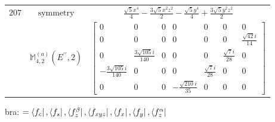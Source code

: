 \documentclass[fleqn,8pt,landscape]{jsarticle}
\begin{document}
\begin{longtable}{ccc}
$ 207 $ & $ \text{symmetry} $ & $ \frac{\sqrt{5} x^{4}}{4} - \frac{3 \sqrt{5} x^{2} z^{2}}{2} - \frac{\sqrt{5} y^{4}}{4} + \frac{3 \sqrt{5} y^{2} z^{2}}{2} $ \\
$  $ & $ \mathbb{M}_{4,2}^{(a)}(E^{\prime\prime},2) $ & $ \begin{bmatrix} 0 & 0 & 0 & 0 & 0 & 0 & 0 \\ 0 & 0 & 0 & 0 & 0 & 0 & \frac{\sqrt{42} i}{14} \\ 0 & \frac{3 \sqrt{105} i}{140} & 0 & 0 & 0 & \frac{\sqrt{7} i}{28} & 0 \\ - \frac{3 \sqrt{105} i}{140} & 0 & 0 & 0 & \frac{\sqrt{7} i}{28} & 0 & 0 \\ 0 & 0 & 0 & - \frac{\sqrt{210} i}{35} & 0 & 0 & 0 \end{bmatrix} $ \\ \hline
\end{longtable}
bra: $=\bra{f_{c}}, \bra{f_{s}}, \bra{f_{z}^{\beta}}, \bra{f_{xyz}}, \bra{f_{x}}, \bra{f_{y}}, \bra{f_{z}^{\alpha}}$
\end{document}
